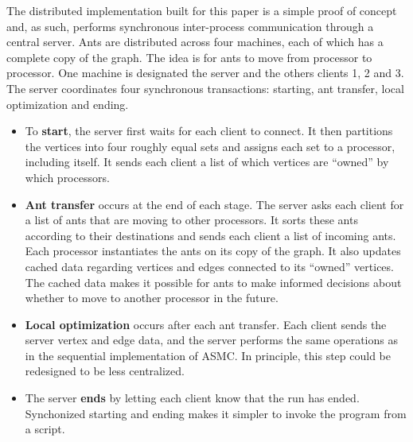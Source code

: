 \documentclass[11pt]{article}
\begin{document}



The distributed implementation built for this paper is a simple proof of
concept and, as such, performs synchronous inter-process communication through a
central server.  Ants are distributed across four machines, each of which has
a complete copy of the graph.  The idea is for ants to move from processor to
processor.  One machine is designated the server and the others clients 1, 2
and 3.  The server coordinates four synchronous transactions: starting, ant
transfer, local optimization and ending.

\begin{itemize}

\item To {\bf start}, the server first waits for each client to connect.  It
then partitions the vertices into four roughly equal sets and assigns each set
to a processor, including itself.  It sends each client a list of which
vertices are ``owned'' by which processors.

\item {\bf Ant transfer} occurs at the end of each stage.  The server asks
each client for a list of ants that are moving to other processors.  It sorts
these ants according to their destinations and sends each client a list of
incoming ants.  Each processor instantiates the ants on its copy of the graph.
It also updates cached data regarding vertices and edges connected to its
``owned'' vertices.  The cached data makes it possible for ants to make
informed decisions about whether to move to another processor in the future.

\item {\bf Local optimization} occurs after each ant transfer.  Each client
sends the server vertex and edge data, and the server performs the same
operations as in the sequential implementation of ASMC.  In principle, this
step could be redesigned to be less centralized.

\item The server {\bf ends} by letting each client know that the run has
ended.  Synchonized starting and ending makes it simpler to invoke the program
from a script.

\end{itemize}
\end{document}
